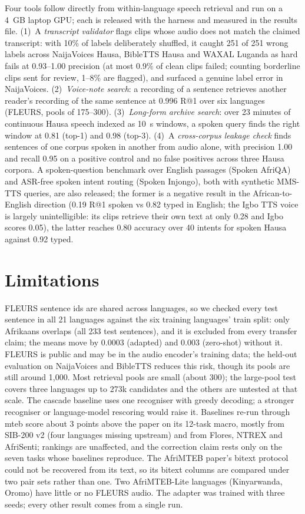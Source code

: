 \documentclass[conference]{IEEEtran}
\makeatletter
\newcommand{\rone}{R@1}
\makeatother
\begin{document}
Four tools follow directly from within-language speech retrieval and run on a
4~GB laptop GPU; each is released with the harness and measured in the
results file. (1)~A \emph{transcript validator} flags clips whose audio does not
match the claimed transcript: with 10\% of labels deliberately shuffled, it
caught 251 of 251 wrong labels across NaijaVoices Hausa, BibleTTS Hausa and
WAXAL Luganda as hard fails at 0.93--1.00 precision (at most 0.9\% of clean clips failed; counting borderline clips sent for review, 1--8\% are flagged), and
surfaced a genuine label error in NaijaVoices. (2)~\emph{Voice-note search}:
a recording of a sentence retrieves another reader's recording of the same
sentence at 0.996 \rone{} over six languages (FLEURS, pools of 175--300).
(3)~\emph{Long-form archive search}: over 23 minutes of continuous Hausa
speech indexed as 10~s windows, a spoken query finds the right window at 0.81
(top-1) and 0.98 (top-3). (4)~A \emph{cross-corpus leakage check} finds
sentences of one corpus spoken in another from audio alone, with precision
1.00 and recall 0.95 on a positive control and no false positives across three
Hausa corpora. A spoken-question benchmark over English passages (Spoken
AfriQA) and ASR-free spoken intent routing (Spoken Injongo), both with
synthetic MMS-TTS queries, are also released;
the former is a negative result in the African-to-English direction (0.19
\rone{} spoken vs 0.82 typed in English; the Igbo TTS voice is largely unintelligible: its clips retrieve their own text at only 0.28 and Igbo scores 0.05), the latter reaches 0.80 accuracy over
40 intents for spoken Hausa against 0.92 typed.

\section{Limitations}

FLEURS sentence ids are shared across languages, so we checked every test
sentence in all 21 languages against the six training languages' train split:
only Afrikaans overlaps (all 233 test sentences), and it is excluded from every
transfer claim; the means move by 0.0003 (adapted) and 0.003 (zero-shot) without it.
FLEURS is public and may be in the audio encoder's training data; the held-out
evaluation on NaijaVoices and BibleTTS reduces this risk, though its pools are
still around 1,000. Most retrieval pools are small (about 300); the large-pool
test covers three languages up to 273k candidates and the others are untested
at that scale. The cascade baseline uses one recogniser with greedy decoding; a
stronger recogniser or language-model rescoring would raise it. Baselines
re-run through mteb score about 3 points above the paper on its 12-task macro,
mostly from SIB-200 v2 (four languages missing upstream) and from Flores,
NTREX and AfriSenti; rankings are unaffected, and the correction claim rests
only on the seven tasks whose baselines reproduce. The AfriMTEB paper's bitext protocol could not be recovered from its
text, so its bitext columns are compared under two pair sets rather than one.
Two AfriMTEB-Lite languages (Kinyarwanda, Oromo) have little or no FLEURS
audio. The adapter was trained with three seeds; every other result comes from a single run.
\end{document}
